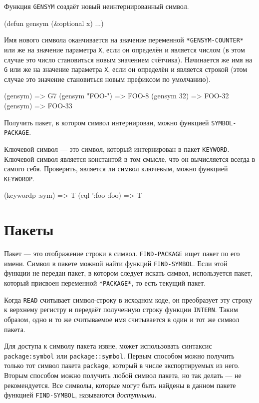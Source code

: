 Функция \lstinline{GENSYM} создаёт новый неинтернированный символ.
\begin{cllst}{}{}
(defun gensym (&optional x) ...)
\end{cllst}

Имя нового символа оканчивается на значение переменной \lstinline{*GENSYM-COUNTER*} или же на значение параметра \lstinline{X}, если он определён и является числом (в этом случае это число становиться новым значением счётчика). Начинается же имя на \lstinline{G} или же на значение параметра \lstinline{X}, если он определён и является строкой (этом случае это значение становиться новым префиксом по умолчанию).
\begin{cllst}{}{}
(gensym) => G7
(gensym "FOO-") => FOO-8
(gensym 32) => FOO-32
(gensym) => FOO-33
\end{cllst}

Получить пакет, в котором символ интернирован, можно функцией \lstinline{SYMBOL-PACKAGE}.

Ключевой символ — это символ, который интернирован в пакет \lstinline{KEYWORD}. Ключевой символ является константой в том смысле, что он вычисляется всегда в самого себя. Проверить, является ли символ ключевым, можно функцией \lstinline{KEYWORDP}.
\begin{cllst}{}{}
(keywordp :sym) => T
(eql ':foo :foo) => T
\end{cllst}

\section{Пакеты}
Пакет — это отображение строки в символ. \lstinline{FIND-PACKAGE} ищет пакет по его имени. Символ в пакете можной найти функций \lstinline{FIND-SYMBOL}.
Если этой функции не передан пакет, в котором следует искать символ, используется пакет, который присвоен переменной \lstinline{*PACKAGE*}, то есть текущий пакет.

Когда \lstinline{READ} считывает символ-строку в исходном коде, он преобразует эту строку к верхнему регистру и передаёт полученную строку функции \lstinline{INTERN}. Таким образом, одно и то же считываемое имя считывается в один и тот же символ пакета.

Для доступа к символу пакета извне, может использовать синтаксис \lstinline{package:symbol} или \lstinline{package::symbol}. Первым способом можно получить только тот символ пакета \lstinline{package}, который в числе экспортируемых из него. Вторым способом можно получить любой символ пакета, но так делать — не рекомендуется. Все символы, которые могут быть найдены в данном пакете функцией \lstinline{FIND-SYMBOL}, называются \emph{доступными}.

